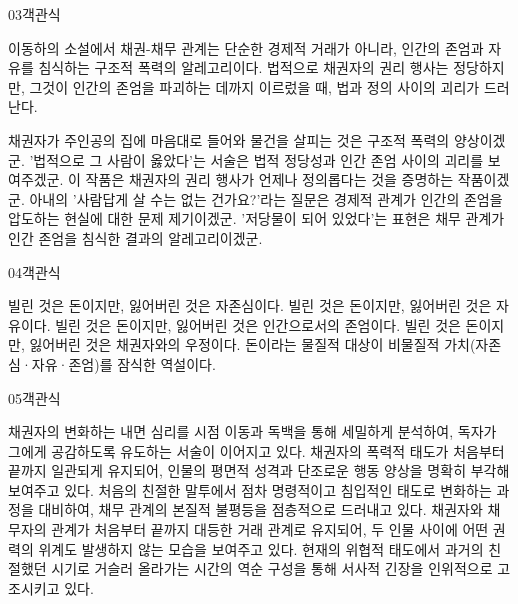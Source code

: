 \documentclass[fs85,seriesWit]{korfarm-base}
\begin{document}
\begin{kfQBlock}{03}{객관식}
\begin{kfEvidence}이동하의 소설에서 채권-채무 관계는 단순한 경제적 거래가 아니라, 인간의 존엄과 자유를 침식하는 구조적 폭력의 알레고리이다. 법적으로 채권자의 권리 행사는 정당하지만, 그것이 인간의 존엄을 파괴하는 데까지 이르렀을 때, 법과 정의 사이의 괴리가 드러난다.\end{kfEvidence}
\begin{kfChoices}
\kfChoice 채권자가 주인공의 집에 마음대로 들어와 물건을 살피는 것은 구조적 폭력의 양상이겠군.
\kfChoice '법적으로 그 사람이 옳았다'는 서술은 법적 정당성과 인간 존엄 사이의 괴리를 보여주겠군.
\kfChoice 이 작품은 채권자의 권리 행사가 언제나 정의롭다는 것을 증명하는 작품이겠군.
\kfChoice 아내의 '사람답게 살 수는 없는 건가요?'라는 질문은 경제적 관계가 인간의 존엄을 압도하는 현실에 대한 문제 제기이겠군.
\kfChoice '저당물이 되어 있었다'는 표현은 채무 관계가 인간 존엄을 침식한 결과의 알레고리이겠군.
\end{kfChoices}
\end{kfQBlock}

\begin{kfQBlock}{04}{객관식}
\begin{kfChoices}
\kfChoice 빌린 것은 돈이지만, 잃어버린 것은 자존심이다.
\kfChoice 빌린 것은 돈이지만, 잃어버린 것은 자유이다.
\kfChoice 빌린 것은 돈이지만, 잃어버린 것은 인간으로서의 존엄이다.
\kfChoice 빌린 것은 돈이지만, 잃어버린 것은 채권자와의 우정이다.
\kfChoice 돈이라는 물질적 대상이 비물질적 가치(자존심·자유·존엄)를 잠식한 역설이다.
\end{kfChoices}
\end{kfQBlock}

\begin{kfQBlock}{05}{객관식}
\begin{kfChoices}
\kfChoice 채권자의 변화하는 내면 심리를 시점 이동과 독백을 통해 세밀하게 분석하여, 독자가 그에게 공감하도록 유도하는 서술이 이어지고 있다.
\kfChoice 채권자의 폭력적 태도가 처음부터 끝까지 일관되게 유지되어, 인물의 평면적 성격과 단조로운 행동 양상을 명확히 부각해 보여주고 있다.
\kfChoice 처음의 친절한 말투에서 점차 명령적이고 침입적인 태도로 변화하는 과정을 대비하여, 채무 관계의 본질적 불평등을 점층적으로 드러내고 있다.
\kfChoice 채권자와 채무자의 관계가 처음부터 끝까지 대등한 거래 관계로 유지되어, 두 인물 사이에 어떤 권력의 위계도 발생하지 않는 모습을 보여주고 있다.
\kfChoice 현재의 위협적 태도에서 과거의 친절했던 시기로 거슬러 올라가는 시간의 역순 구성을 통해 서사적 긴장을 인위적으로 고조시키고 있다.
\end{kfChoices}
\end{kfQBlock}
\end{document}
